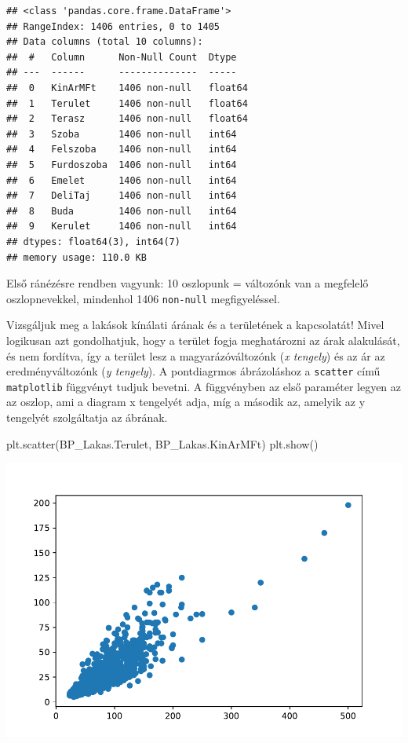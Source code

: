 \documentclass[
]{book}
\newenvironment{Shaded}{\begin{snugshade}}{\end{snugshade}}
\newcommand{\NormalTok}[1]{#1}
\begin{document}
\begin{verbatim}
## <class 'pandas.core.frame.DataFrame'>
## RangeIndex: 1406 entries, 0 to 1405
## Data columns (total 10 columns):
##  #   Column      Non-Null Count  Dtype  
## ---  ------      --------------  -----  
##  0   KinArMFt    1406 non-null   float64
##  1   Terulet     1406 non-null   float64
##  2   Terasz      1406 non-null   float64
##  3   Szoba       1406 non-null   int64  
##  4   Felszoba    1406 non-null   int64  
##  5   Furdoszoba  1406 non-null   int64  
##  6   Emelet      1406 non-null   int64  
##  7   DeliTaj     1406 non-null   int64  
##  8   Buda        1406 non-null   int64  
##  9   Kerulet     1406 non-null   int64  
## dtypes: float64(3), int64(7)
## memory usage: 110.0 KB
\end{verbatim}

Első ránézésre rendben vagyunk: 10 oszlopunk = változónk van a megfelelő oszlopnevekkel, mindenhol 1406 \texttt{non-null} megfigyeléssel.

Vizsgáljuk meg a lakások kínálati árának és a területének a kapcsolatát! Mivel logikusan azt gondolhatjuk, hogy a terület fogja meghatározni az árak alakulását, és nem fordítva, így a terület lesz a magyarázóváltozónk (\emph{x tengely}) és az ár az eredményváltozónk (\emph{y tengely}). A pontdiagrmos ábrázoláshoz a \texttt{scatter} című \texttt{matplotlib} függvényt tudjuk bevetni. A függvényben az első paraméter legyen az az oszlop, ami a diagram x tengelyét adja, míg a második az, amelyik az y tengelyét szolgáltatja az ábrának.

\begin{Shaded}
\begin{Highlighting}[]
\NormalTok{plt.scatter(BP\_Lakas.Terulet, BP\_Lakas.KinArMFt)}
\NormalTok{plt.show()}
\end{Highlighting}
\end{Shaded}

\includegraphics{_main_files/figure-latex/unnamed-chunk-382-37.pdf}
\end{document}
